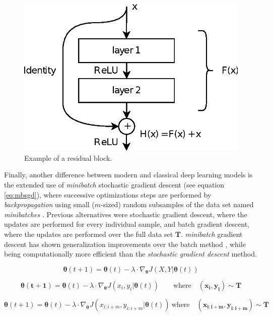 \begin{figure}
	\centering
	\includegraphics[width=0.5\linewidth]{chapter2/images/residual}
	\caption{Example of a residual block.}
	\label{fig:residual}
\end{figure}


Finally, another difference between modern and classical deep learning models is the extended use of \textit{minibatch} stochastic gradient descent (see equation \ref{eq:mbsgd}), where successive optimizations steps are performed by \textit{backpropagation} using small ($m$-sized) random subsamples of the data set named \textit{minibatches} \autocite{ruder2016}. Previous alternatives were stochastic gradient descent, where the updates are performed for every individual sample, and batch gradient descent, where the updates are performed over the full data set $\mathbf{T}$. \textit{minibatch} gradient descent has shown generalization improvements over the batch method \autocite{Hoffer2017}, while being computationally more efficient than the \textit{stochastic gradient descent} method.


\begin{equation}
	\label{eq:bgd}
	\mathbf{\theta}(t+1) = \mathbf{\theta}(t) - \lambda \cdot \nabla_\mathbf{\theta} J(X, Y|\mathbf{\theta}(t))
\end{equation}

\begin{equation}
	\label{eq:sgd}
	\mathbf{\theta(t+1)} = \mathbf{\theta}(t) - \lambda \cdot \nabla_\mathbf{\theta} J(x_i, y_i|\mathbf{\theta}(t)) \quad \mathrm \quad \mathrm{where} \quad (\mathbf{x_i}, \mathbf{y_i}) \sim \mathbf{T}
\end{equation}

\begin{equation}
	\label{eq:mbsgd}
	\mathbf{\theta}(t+1) = \mathbf{\theta}(t) - \lambda \cdot \nabla_\mathbf{\theta} J(x_{i:i+m}, y_{i:i+m}|\mathbf{\theta}(t)) \  \mathrm{where} \quad  (\mathbf{x_{i:i+m}}, \mathbf{y_{i:i+m}}) \sim \mathbf{T}
\end{equation}


